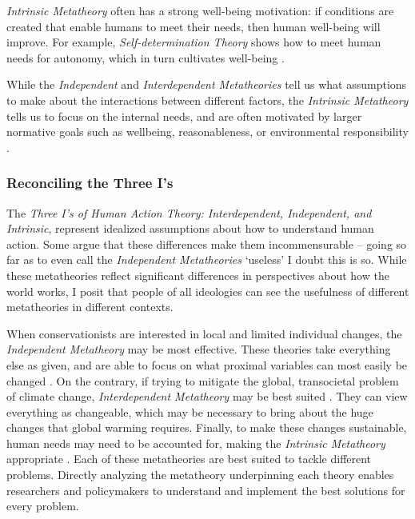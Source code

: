 \documentclass[12 pt]{article}
\begin{document}
	 \textit{Intrinsic Metatheory} often has a strong well-being motivation: if conditions are created that enable humans to meet their needs, then human well-being will improve. For example, \textit{Self-determination Theory} shows how to meet human needs for autonomy, which in turn cultivates well-being \parencite{Ryan2000a}.
	 
	 While the \textit{Independent} and \textit{Interdependent Metatheories} tell us what assumptions to make about the interactions between different factors, the \textit{Intrinsic Metatheory} tells us to focus on the internal needs, and are often motivated by larger normative goals such as wellbeing, reasonableness, or environmental responsibility \parencite{Hungerford1990, Ryan2000a,Kaplan2009}.
	 
	 	\subsubsection{Reconciling the Three I's}  The \textit{Three I's of Human Action Theory: Interdependent, Independent, and Intrinsic},  represent idealized assumptions about how to understand human action. Some argue that these differences make them incommensurable -- going so far as to even call the \textit{Independent Metatheories} `useless' \parencite[][p. 1202]{Shove2010} I doubt this is so. While these metatheories reflect significant differences in perspectives about how the world works, I posit that people of all ideologies can see the usefulness of different metatheories in different contexts. 
	 	
	 	 When conservationists are interested in local and limited individual changes, the \textit{Independent Metatheory} may be most effective. These theories take everything else as given, and are able to focus on what proximal variables can most easily be changed \parencite{Hastings2003}. On the contrary, if trying to mitigate the global, transocietal problem of climate change, \textit{Interdependent Metatheory} may be best suited \parencite{Shove2010}. They can view everything as changeable, which may be necessary to bring about the huge changes that global warming requires. Finally, to make these changes sustainable, human needs may need to be accounted for, making the \textit{Intrinsic Metatheory} appropriate \parencite{Herzberg1968,Ryan2000a}. Each of these metatheories are best suited to tackle different problems. Directly analyzing the metatheory underpinning each theory enables researchers and policymakers to understand and implement the best solutions for every problem. 
	 
\end{document}
